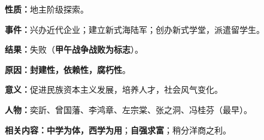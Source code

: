 {\textbf{{性质}：}地主阶级探索。}

{\textbf{{事件}：}{兴办近代企业；建立新式海陆军；创办新式学堂，派遣留学生}。}

{\textbf{{结果}：}失败（\textbf{{甲午战争战败为标志}}）。}

{\textbf{{原因}：{封建性，依赖性，腐朽性}}。}

{\textbf{{意义}：}促进民族资本主义发展，培养人才，社会风气变化。}

{\textbf{{人物}：}{奕訢、曾国藩、李鸿章、左宗棠、张之洞、冯桂芬（最早）。}}

{\textbf{{相关内容}：{中学为体，西学为用}}{；}\textbf{{自强求富}}{；}{稍分洋商之利。}}
